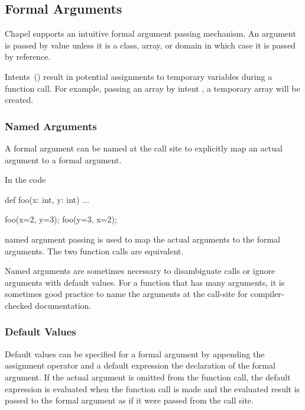 \subsection{Formal Arguments}
\label{Formal_Arguments}

Chapel supports an intuitive formal argument passing mechanism.  An
argument is passed by value unless it is a class, array, or domain in
which case it is passed by reference.

Intents~() result in potential assignments to temporary
variables during a function call.  For example, passing an array by
intent , a temporary array will be created.

\subsubsection{Named Arguments}
\label{Named_Arguments}

A formal argument can be named at the call site to explicitly map an
actual argument to a formal argument.

\begin{example}
In the code
\begin{chapel}
def foo(x: int, y: int) { ... }

foo(x=2, y=3);
foo(y=3, x=2);
\end{chapel}
named argument passing is used to map the actual arguments to the
formal arguments.  The two function calls are equivalent.
\end{example}

Named arguments are sometimes necessary to disambiguate calls or
ignore arguments with default values.  For a function that has many
arguments, it is sometimes good practice to name the arguments at the
call-site for compiler-checked documentation.

\subsubsection{Default Values}
\label{Default_Values}

Default values can be specified for a formal argument by appending the
assignment operator and a default expression the declaration of the
formal argument.  If the actual argument is omitted from the function
call, the default expression is evaluated when the function call is
made and the evaluated result is passed to the formal argument as if
it were passed from the call site.

